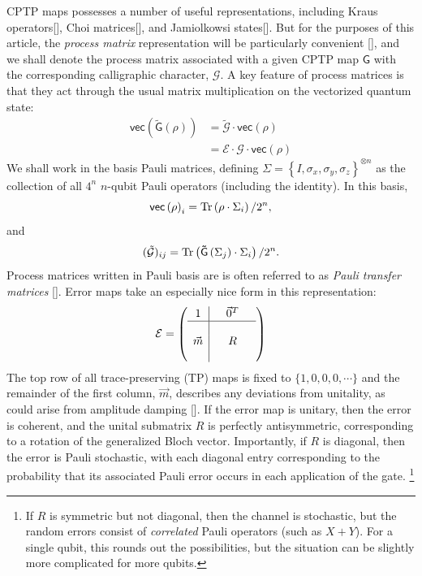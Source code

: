 \documentclass[aps,nofootinbib,pra,notitlepage,twocolumn]{revtex4-1}
\newcommand{\tr}{{\rm Tr\thinspace}}
\newcommand{\vectorize}[1]{\ensuremath{\mathsf{vec}\left(#1\right)}}
\begin{document}
 CPTP maps possesses a number of useful representations, including Kraus operators[], Choi matrices[], and Jamiolkowsi states[]. But for the purposes of this article, the \emph{process matrix} representation will be particularly convenient [], and we shall denote the process matrix associated with a given CPTP map $\mathsf{G}$ with the corresponding calligraphic character, $\mathcal{G}$. A key feature of process matrices is that they act through the usual matrix multiplication on the vectorized quantum state:
\begin{align}
	\vectorize{\mathsf{\tilde G}(\rho)}
		&= \mathcal{\tilde G}\cdot\vectorize{\rho} \\
		&= \mathcal{E}\cdot\mathcal{G}\cdot\vectorize{\rho}
\end{align}
We shall work in the basis Pauli matrices, defining $\Sigma = \left\{I, \sigma_x, \sigma_y, \sigma_z\right\}^{\otimes n}$ as the collection of all $4^n$ $n$-qubit Pauli operators (including the identity).  In this basis,
\begin{equation}
  \vectorize{\rho}_i = \tr\!\left(\rho \cdot\Sigma_i\right)/2^n,
\end{equation}
and
\begin{equation}
	(\mathcal{\tilde G})_{ij} = \tr\!\left(\mathsf{\tilde G}\left(\Sigma_j\right) \cdot\Sigma_i\right)/2^n.
\end{equation}
Process matrices written in Pauli basis are is often referred to as \emph{Pauli transfer matrices} []. Error maps take an especially nice form in this representation:
\begin{equation}\label{eq:process_matrix}
\mathcal{E} =
	\left(\begin{array}{c|cccc}
		1 &  & \vec{0}^T & \\ 
		\hline & &  &  \\
		\vec{m} &  & R &  \\
		 &  &  & 
	\end{array} 	
	\right)
\end{equation}
The top row of all trace-preserving (TP) maps is fixed to $\{1,0,0,0,\cdots\}$ and the remainder of the first column, $\vec{m}$, describes any deviations from unitality, as could arise from amplitude damping []. If the error map is unitary, then the error is coherent, and the unital submatrix $R$ is perfectly antisymmetric, corresponding to a rotation of the generalized Bloch vector. Importantly, if $R$ is diagonal, then the error is Pauli stochastic, with each diagonal entry corresponding to the probability that its associated Pauli error occurs in each application of the gate. \footnote{If $R$ is symmetric but not diagonal, then the channel is stochastic, but the random errors consist of \emph{correlated} Pauli operators (such as $X+Y$). For a single qubit, this rounds out the possibilities, but the situation can be slightly more complicated for more qubits.} 
\end{document}
